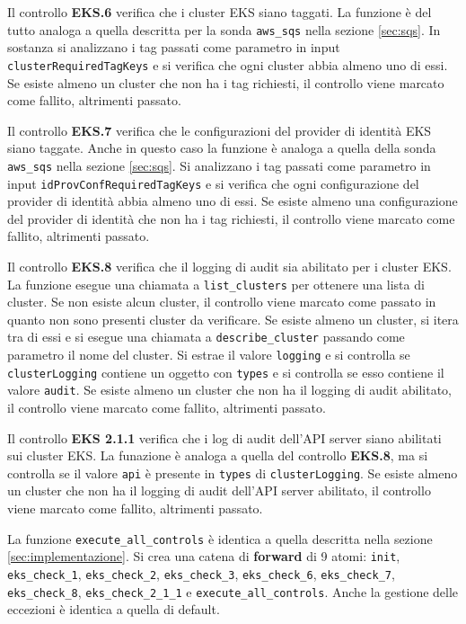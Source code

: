 Il controllo \textbf{EKS.6} verifica che i cluster EKS siano taggati. La funzione è del tutto analoga a quella descritta per la sonda \texttt{aws\_sqs} nella sezione \ref{sec:sqs}. In sostanza si analizzano i tag passati come parametro in input \texttt{clusterRequiredTagKeys} e si verifica che ogni cluster abbia almeno uno di essi. Se esiste almeno un cluster che non ha i tag richiesti, il controllo viene marcato come fallito, altrimenti passato.

Il controllo \textbf{EKS.7} verifica che le configurazioni del provider di identità EKS siano taggate. Anche in questo caso la funzione è analoga a quella della sonda \texttt{aws\_sqs} nella sezione \ref{sec:sqs}. Si analizzano i tag passati come parametro in input \texttt{idProvConfRequiredTagKeys} e si verifica che ogni configurazione del provider di identità abbia almeno uno di essi. Se esiste almeno una configurazione del provider di identità che non ha i tag richiesti, il controllo viene marcato come fallito, altrimenti passato.

Il controllo \textbf{EKS.8} verifica che il logging di audit sia abilitato per i cluster EKS. La funzione esegue una chiamata a \texttt{list\_clusters} per ottenere una lista di cluster. Se non esiste alcun cluster, il controllo viene marcato come passato in quanto non sono presenti cluster da verificare. Se esiste almeno un cluster, si itera tra di essi e si esegue una chiamata a \texttt{describe\_cluster} passando come parametro il nome del cluster. Si estrae il valore \texttt{logging} e si controlla se \texttt{clusterLogging} contiene un oggetto con \texttt{types} e si controlla se esso contiene il valore \texttt{audit}. Se esiste almeno un cluster che non ha il logging di audit abilitato, il controllo viene marcato come fallito, altrimenti passato.

Il controllo \textbf{EKS 2.1.1} verifica che i log di audit dell'API server siano abilitati sui cluster EKS. La funazione è analoga a quella del controllo \textbf{EKS.8}, ma si controlla se il valore \texttt{api} è presente in \texttt{types} di \texttt{clusterLogging}. Se esiste almeno un cluster che non ha il logging di audit dell'API server abilitato, il controllo viene marcato come fallito, altrimenti passato.

La funzione \texttt{execute\_all\_controls} è identica a quella descritta nella sezione \ref{sec:implementazione}. Si crea una catena di \textbf{forward} di 9 atomi: \texttt{init}, \texttt{eks\_check\_1}, \texttt{eks\_check\_2}, \texttt{eks\_check\_3}, \texttt{eks\_check\_6}, \texttt{eks\_check\_7}, \texttt{eks\_check\_8}, \texttt{eks\_check\_2\_1\_1} e \texttt{execute\_all\_controls}. Anche la gestione delle eccezioni è identica a quella di default.

